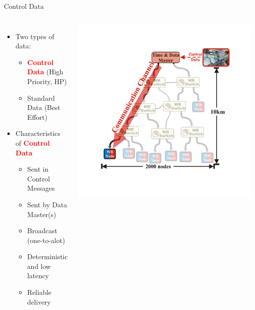 \documentclass[compress,red]{beamer}
\begin{document}
\begin{frame}{Control Data}

\begin{columns}[c]
    \begin{itemize}
      \item Two types of data:
	  \begin{itemize}
	    \item \textcolor{red}{\bf Control Data} (High Priority, HP)
	    \item Standard Data (Best Effort)
	  \end{itemize}
	  \item Characteristics of \textcolor{red}{\bf Control Data}
	  \begin{itemize}
	    \item Sent in Control Messages
	    \item Sent by Data Master(s)
	    \item Broadcast (one-to-alot)
	    \item Deterministic and low latency
	    \item Reliable delivery
	  \end{itemize}
    \end{itemize}
    \begin{center}
    \includegraphics[height=0.8\textheight]{../../figures/robustness/communication_channel-pro}

\end{center}
\end{columns}
\end{frame}
\end{document}
